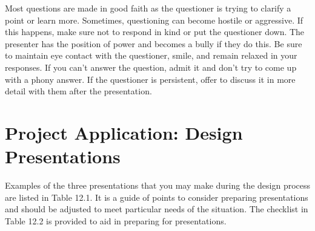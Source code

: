 Most questions are made in good faith as the questioner is trying to
clarify a point or learn more. Sometimes, questioning can become hostile
or aggressive. If this happens, make sure not to respond in kind or put
the questioner down. The presenter has the position of power and becomes
a bully if they do this. Be sure to maintain eye contact with the
questioner, smile, and remain relaxed in your responses. If you can't
answer the question, admit it and don't try to come up with a phony
answer. If the questioner is persistent, offer to discuss it in more
detail with them after the presentation.

\section{Project Application: Design Presentations}
\label{section:project-application-design-presentations}

Examples of the three presentations that you may make during the design
process are listed in Table 12.1. It is a guide of points to consider
preparing presentations and should be adjusted to meet particular needs
of the situation. The checklist in Table 12.2 is provided to aid in
preparing for presentations.


